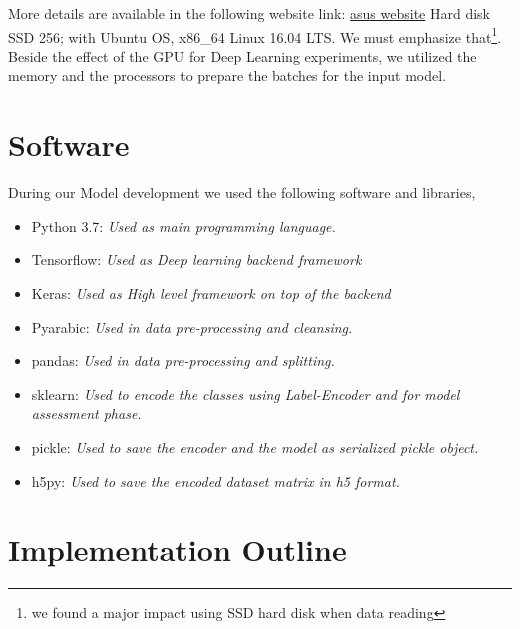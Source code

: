 More details are available in the following website link: \href{https://www.asus.com/us/Graphics-Cards/AC-ORIGINS-ROG-STRIX-GTX1080TI/}{asus website}
Hard disk SSD 256; with Ubuntu OS, x86\_64 Linux 16.04 LTS. We must emphasize that\footnote{we found a major impact using SSD hard disk when data reading}. Beside the effect of the GPU for Deep Learning experiments, we utilized the memory and the processors to prepare the batches for the input model.

\section{Software}

During our Model development we used the following software and libraries,

\begin{itemize}
 \item Python 3.7: \textit{Used as main programming language.}
 \item Tensorflow: \textit{Used as Deep learning backend framework}
 \item Keras: \textit{Used as High level framework on top of the backend}
 \item Pyarabic: \textit{Used in data pre-processing and cleansing.}
 \item pandas: \textit{Used in data pre-processing and splitting.}
 \item sklearn: \textit{Used to encode the classes using Label-Encoder and for model assessment phase.}
 \item pickle: \textit{Used to save the encoder and the model as serialized pickle object.}
 \item h5py: \textit{Used to save the encoded dataset matrix in h5 format.}
\end{itemize}

\section{Implementation Outline}

